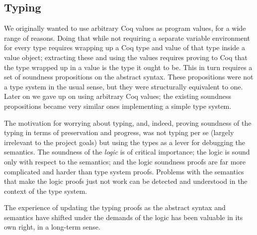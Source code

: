 
\subsection{Typing}

We originally wanted to use arbitrary Coq values as program values,
for a wide range of reasons.
Doing that while not requiring a separate variable environment for
every type requires wrapping up a Coq type and value of that type
inside a value object; extracting these and using the values requires
proving to Coq that the type wrapped up in a value is the type it
ought to be.
This in turn requires a set of soundness propositions on the abstract
syntax.
These propositions were not a type system in the usual sense, but they
were structurally equivalent to one.
Later on we gave up on using arbitrary Coq values; the existing
soundness propositions became very similar ones implementing
a simple type system.

The motivation for worrying about typing, and, indeed, proving
soundness of the typing in terms of preservation and progress, was not
typing per se (largely irrelevant to the project goals) but using the
types as a lever for debugging the semantics.
The soundness of the \emph{logic} is of critical importance; the logic
is sound only with respect to the semantics; and the logic soundness
proofs are far more complicated and harder than type system proofs.
Problems with the semantics that make the logic proofs just not work
can be detected and understood in the context of the type system.

The experience of updating the typing proofs as the abstract syntax
and semantics have shifted under the demands of the logic has been
valuable in its own right, in a long-term sense.


%

